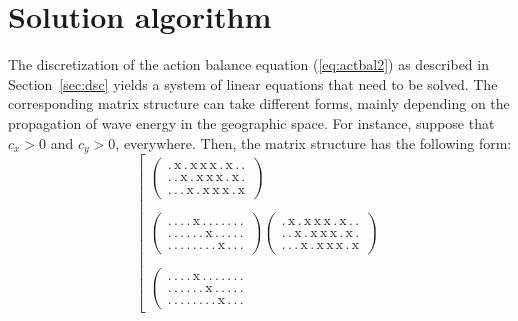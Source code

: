 \documentclass[12pt]{book}
\begin{document}
\section{Solution algorithm} \label{sec:sol}

The discretization of the action balance equation (\ref{eq:actbal2}) as described in Section~\ref{sec:dsc} yields
a system of linear equations that need to be solved. The corresponding matrix structure can
take different forms, mainly depending on the propagation of wave energy in the geographic space. For instance,
suppose that $c_x > 0$ and $c_y > 0$, everywhere. Then, the matrix structure has the following form:
\begin{equation}
  \left[
    \begin{array}{l}
       \left(
         \begin{array}{l}
            \mathrm{.\, x\, .\, x\, x\, x\, .\, x\, .\, .\,} \\
            \mathrm{.\, .\, x\, .\, x\, x\, x\, .\, x\, .\,} \\
            \mathrm{.\, .\, .\, x\, .\, x\, x\, x\, .\, x\,}
         \end{array}
       \right)\\
       \\
       \left(
         \begin{array}{l}
            \mathrm{.\,.\, .\, .\, x\, .\, .\, .\, .\, .\, .\,.\,} \\
            \mathrm{.\,.\, .\, .\, .\, .\, x\, .\, .\, .\, .\,.\,} \\
            \mathrm{.\,.\, .\, .\, .\, .\, .\, .\, x\, .\, .\,.\,}
         \end{array}
       \right)
       \left(
         \begin{array}{l}
            \mathrm{.\, x\, .\, x\, x\, x\, .\, x\, .\, .\,} \\
            \mathrm{.\, .\, x\, .\, x\, x\, x\, .\, x\, .\,} \\
            \mathrm{.\, .\, .\, x\, .\, x\, x\, x\, .\, x\,}
         \end{array}
       \right)\\
       \\
       \left(
         \begin{array}{l}
            \mathrm{.\,.\, .\, .\, x\, .\, .\, .\, .\, .\, .\,.\,} \\
            \mathrm{.\,.\, .\, .\, .\, .\, x\, .\, .\, .\, .\,.\,} \\
            \mathrm{.\,.\, .\, .\, .\, .\, .\, .\, x\, .\, .\,.\,}

\end{array}
\end{array}
\end{equation}
\end{document}
